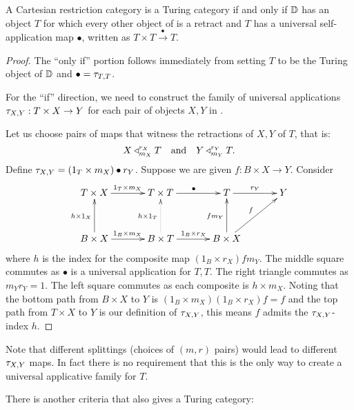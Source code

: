 \begin{theorem}\label{thm:turing_recognition}
  A Cartesian restriction category \D is a Turing category if and only if $\mathbb{D}$ has an object $T$
  for which every other object of \D is a retract and $T$ has a universal self-application map
  $\bullet$, written as $T\times T \xrightarrow{\ \bullet\ }T$.
\end{theorem}
\begin{proof}
  The ``only if'' portion follows immediately from setting $T$ to be the Turing object of $\mathbb{D}$ and
  $\bullet = \tau_{{T},{T}}$.

  For the ``if'' direction, we need to construct the family of universal applications
  $\tau_{{X},{Y}} : T\times X \to Y$ for each pair of objects $X,Y$ in \D.

  Let us choose pairs of maps that witness the retractions of $X, Y$ of $T$, that is:
  \[
    X \triangleleft_{m_X}^{r_X} T \quad\text{and}\quad Y\triangleleft_{m_Y}^{r_Y} T.
  \]
  Define $\tau_{{X},{Y}} = (1_T\times m_X ) \bullet r_Y$. Suppose we are given $f:B\times X \to Y$. Consider
  \[
    \xymatrix@C+10pt@R+10pt{
      T \times X \ar[r]^{1_T\times m_X} & T\times T \ar[r]^{\bullet} & T \ar[r]^{r_Y} & Y \\
      B \times X \ar[r]^{1_B\times m_X} \ar[u]^{h\times 1_X}
        & B \times T \ar@{.>}[u]^{h\times 1_T} \ar[r]^{1_B \times r_X}
        & B \times X \ar[ur]^{f} \ar[u]^{f m_Y}
      }
  \]
  where $h$ is the index for the composite map $(1_B \times r_X) f m_Y$. The middle square commutes
  as $\bullet$ is a universal application for $T,T$. The right triangle commutes as $m_Y r_Y =1$.
  The left square commutes as each composite is $h \times m_X$. Noting that the bottom path from
  $B\times X$ to $Y$ is $(1_B \times m_X)(1_B \times r_X)f = f$ and the top path from $T\times X$ to
  $Y$ is our definition of $\tau_{{X},{Y}}$, this means $f$ admits the $\tau_{{X},{Y}}$-index $h$.
\end{proof}

Note that different splittings (choices of $(m,r)$ pairs) would lead to different $\tau_{{X},{Y}}$ maps. In
fact there is no requirement that this is the only way to create a universal applicative family
for $T$.

There is another criteria that also gives a Turing category:

